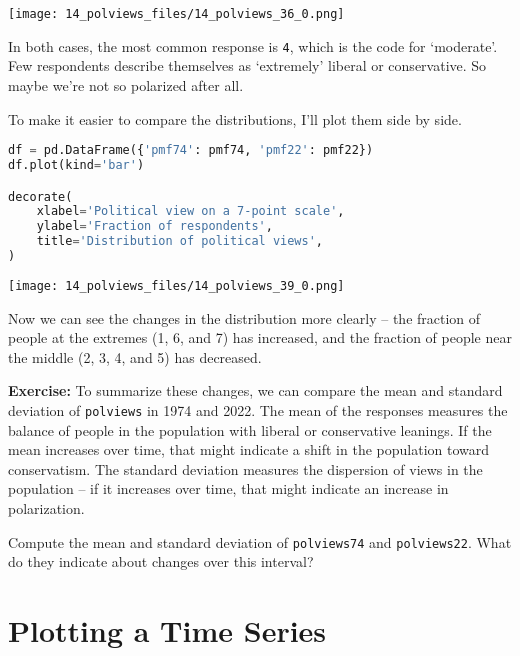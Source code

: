 \begin{center}
\texttt{[image: 14\_polviews\_files/14\_polviews\_36\_0.png]}
\end{center}

In both cases, the most common response is \passthrough{\lstinline!4!},
which is the code for `moderate'. Few respondents describe themselves as
`extremely' liberal or conservative. So maybe we're not so polarized
after all.

\pagebreak

To make it easier to compare the distributions, I'll plot them side by
side.

\begin{lstlisting}[language=Python,style=source]
df = pd.DataFrame({'pmf74': pmf74, 'pmf22': pmf22})
df.plot(kind='bar')

decorate(
    xlabel='Political view on a 7-point scale',
    ylabel='Fraction of respondents',
    title='Distribution of political views',
)
\end{lstlisting}

\begin{center}
\texttt{[image: 14\_polviews\_files/14\_polviews\_39\_0.png]}
\end{center}

Now we can see the changes in the distribution more clearly -- the
fraction of people at the extremes (1, 6, and 7) has increased, and the
fraction of people near the middle (2, 3, 4, and 5) has decreased.

\textbf{Exercise:} To summarize these changes, we can compare the mean
and standard deviation of \passthrough{\lstinline!polviews!} in 1974 and
2022. The mean of the responses measures the balance of people in the
population with liberal or conservative leanings. If the mean increases
over time, that might indicate a shift in the population toward
conservatism. The standard deviation measures the dispersion of views in
the population -- if it increases over time, that might indicate an
increase in polarization.

Compute the mean and standard deviation of
\passthrough{\lstinline!polviews74!} and
\passthrough{\lstinline!polviews22!}. What do they indicate about
changes over this interval?

\section{Plotting a Time Series}\label{plotting-a-time-series}

